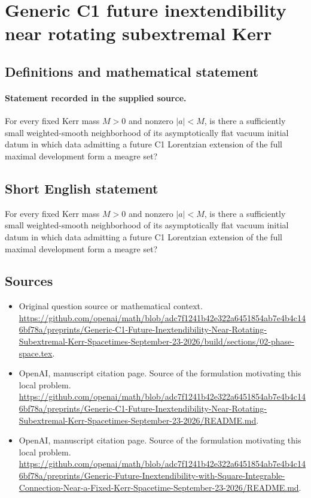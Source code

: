 \documentclass[11pt]{article}
\begin{document}
\section*{Generic C1 future inextendibility near rotating subextremal Kerr}\label{statement}
\subsection{Definitions and mathematical statement}
\paragraph{Statement recorded in the supplied source.}
For every fixed Kerr mass $M>0$ and nonzero $|a|<M$, is there a sufficiently small weighted-smooth neighborhood of its asymptotically flat vacuum initial datum in which data admitting a future C1 Lorentzian extension of the full maximal development form a meagre set?
\subsection{Short English statement}
For every fixed Kerr mass $M>0$ and nonzero $|a|<M$, is there a sufficiently small weighted-smooth neighborhood of its asymptotically flat vacuum initial datum in which data admitting a future C1 Lorentzian extension of the full maximal development form a meagre set?
\subsection{Sources}
\begin{itemize}
\item[S1] Original question source or mathematical context.
\url{https://github.com/openai/math/blob/adc7f1241b42e322a6451854ab7e4b4c146bf78a/preprints/Generic-C1-Future-Inextendibility-Near-Rotating-Subextremal-Kerr-Spacetimes-September-23-2026/build/sections/02-phase-space.tex}.
\item[S2] OpenAI, manuscript citation page. Source of the formulation motivating this local problem.
\url{https://github.com/openai/math/blob/adc7f1241b42e322a6451854ab7e4b4c146bf78a/preprints/Generic-C1-Future-Inextendibility-Near-Rotating-Subextremal-Kerr-Spacetimes-September-23-2026/README.md}.
\item[S3] OpenAI, manuscript citation page. Source of the formulation motivating this local problem.
\url{https://github.com/openai/math/blob/adc7f1241b42e322a6451854ab7e4b4c146bf78a/preprints/Generic-Future-Inextendibility-with-Square-Integrable-Connection-Near-a-Fixed-Kerr-Spacetime-September-23-2026/README.md}.
\end{itemize}
\end{document}
